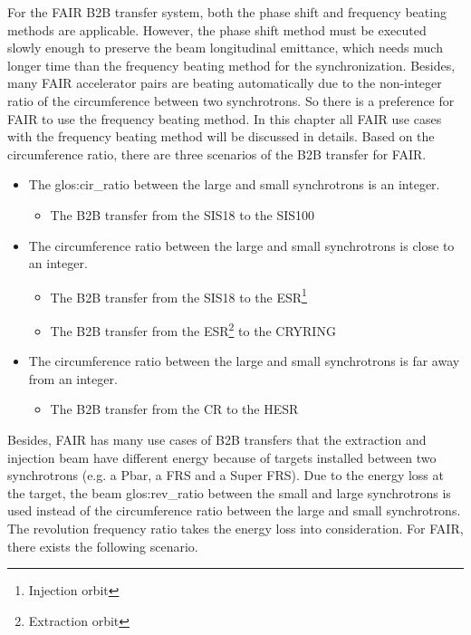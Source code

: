For the FAIR B2B transfer system, both the phase shift and frequency beating methods are applicable. However, the phase shift method must be executed slowly enough to preserve the beam longitudinal emittance, which needs much longer time than the frequency beating method for the synchronization. Besides, many FAIR accelerator pairs are beating automatically due to the non-integer ratio of the circumference between two synchrotrons. So there is a preference for FAIR to use the frequency beating method. In this chapter all FAIR use cases with the frequency beating method will be discussed in details. Based on the circumference ratio, there are three scenarios of the B2B transfer for FAIR. 
\begin{itemize}
	\item The \gls{glos:cir_ratio} between the large and small synchrotrons is an integer.
		\begin{itemize}
			\item	The B2B transfer from the SIS18 to the SIS100

		\end{itemize}
	\item The circumference ratio between the large and small synchrotrons is close to an integer.
		\begin{itemize}
			\item The B2B transfer from the SIS18 to the ESR\footnote{Injection orbit}
			\item The B2B transfer from the ESR\footnote{Extraction orbit} to the CRYRING
		\end{itemize}
 	\item The circumference ratio between the large and small synchrotrons is far away from an integer.
		\begin{itemize}
			\item The B2B transfer from the CR to the HESR
		\end{itemize}
\end{itemize}
Besides, FAIR has many use cases of B2B transfers that the extraction and injection beam have different energy because of targets installed between two synchrotrons (e.g. a Pbar, a FRS and a Super FRS). Due to the energy loss at the target, the beam \gls{glos:rev_ratio} between the small and large synchrotrons is used instead of the circumference ratio between the large and small synchrotrons. The revolution frequency ratio takes the energy loss into consideration. For FAIR, there exists the following scenario.


